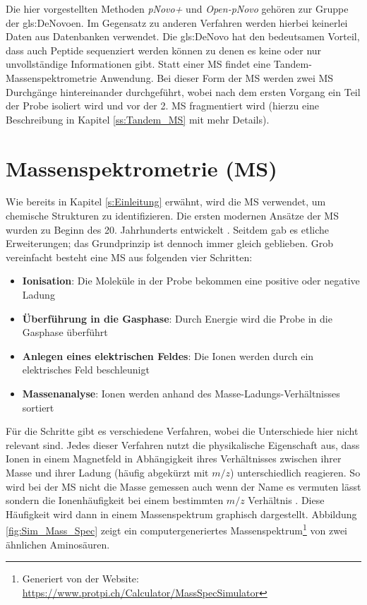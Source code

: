 \documentclass[a4paper, 12pt]{article}
\newcommand{\gerquot}[1]{\glqq#1\grqq}
\newcommand{\dashAndSpace}{\textendash \space}
\newcommand{\dashAndSpaceSeq}[1]{\dashAndSpace#1 \dashAndSpace}
\newcommand{\massCharge}{$ m/z $ }
\begin{document}
Die hier vorgestellten Methoden \emph{pNovo+} und \emph{Open-pNovo} gehören zur Gruppe der \gls{gls:DeNovo}en. Im Gegensatz zu anderen Verfahren werden hierbei keinerlei Daten aus Datenbanken verwendet. Die \gls{gls:DeNovo} hat den bedeutsamen Vorteil, dass auch Peptide sequenziert werden können zu denen es keine oder nur unvollständige Informationen gibt. Statt einer MS findet eine Tandem-Massenspektrometrie Anwendung. Bei dieser Form der MS werden zwei MS Durchgänge hintereinander durchgeführt, wobei nach dem ersten Vorgang ein Teil der Probe isoliert wird und vor der 2. MS \gerquot{fragmentiert} wird (hierzu eine Beschreibung in Kapitel \ref{ss:Tandem_MS} mit mehr Details).



\section{Massenspektrometrie (MS)}\label{s:MS}
Wie bereits in Kapitel \ref{s:Einleitung} erwähnt, wird die MS verwendet, um chemische Strukturen zu identifizieren. Die ersten modernen Ansätze der MS wurden zu Beginn des 20. Jahrhunderts entwickelt \cite[5678]{griffiths2008brief}. Seitdem gab es etliche Erweiterungen; das Grundprinzip ist dennoch immer gleich geblieben. Grob vereinfacht besteht eine MS aus folgenden vier Schritten:

\begin{itemize}
   \item \textbf{Ionisation}: Die Moleküle in der Probe bekommen eine positive oder negative Ladung
   \item \textbf{Überführung in die Gasphase}: Durch Energie wird die Probe in die Gasphase überführt
   \item \textbf{Anlegen eines elektrischen Feldes}: Die Ionen werden durch ein elektrisches Feld beschleunigt
   \item \textbf{Massenanalyse}: Ionen werden anhand des Masse-Ladungs-Verhältnisses \gerquot{sortiert}
\end{itemize}

Für die Schritte gibt es verschiedene Verfahren, wobei die Unterschiede hier nicht relevant sind. Jedes dieser Verfahren nutzt die physikalische Eigenschaft aus, dass Ionen in einem Magnetfeld in Abhängigkeit ihres Verhältnisses zwischen ihrer Masse und ihrer Ladung (häufig abgekürzt mit $ m/z $) unterschiedlich reagieren. So wird bei der MS nicht die Masse gemessen \dashAndSpaceSeq{auch wenn der Name es vermuten lässt} sondern die Ionenhäufigkeit bei einem bestimmten \massCharge Verhältnis \cite[140]{Glish2003}. Diese Häufigkeit wird dann in einem Massenspektrum graphisch dargestellt. Abbildung \ref{fig:Sim_Mass_Spec} zeigt ein computergeneriertes Massenspektrum\footnote{Generiert von der Website: \url{https://www.protpi.ch/Calculator/MassSpecSimulator}} von zwei ähnlichen Aminosäuren.
\end{document}
